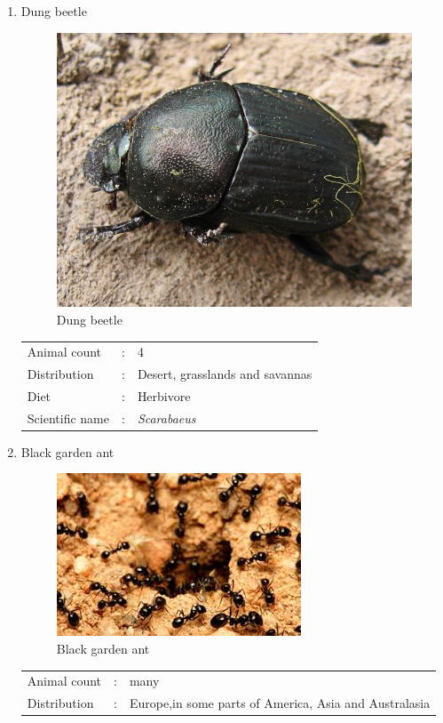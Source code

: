 \documentclass[a4paper, 12pt]{article}
\begin{document}
\begin{enumerate}
\item Dung beetle\\
\begin{figure}[H]
\centering
\includegraphics[scale=0.3]{Image/fjskdfsafhak.jpg}
\caption{Dung beetle}
\end{figure}
\begin{tabular}{lcl}
Animal count     &:& 4\\
Distribution     &:& Desert, grasslands and savannas\\
Diet             &:& Herbivore\\
Scientific name  &:& \textit{Scarabaeus}
\end{tabular}
\item Black garden ant\\
\begin{figure}[H]
\centering
\includegraphics[scale=0.75]{Image/blackants.jpeg}
\caption{Black garden ant}
\end{figure}
\begin{tabular}{lcl}
Animal count     &:& many\\
Distribution     &:& Europe,in some parts of America, Asia and Australasia\\

\end{tabular}
\end{enumerate}
\end{document}
